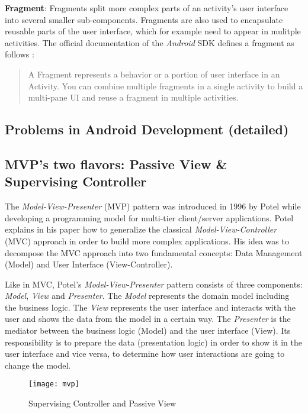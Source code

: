 \textbf{Fragment}: Fragments split more complex parts of an activity's user interface into several smaller sub-components. Fragments are also used to encapsulate reusable parts of the user interface, which for example need to appear in mulitple activities. The official documentation of the \emph{Android} SDK defines a fragment as follows \cite{SDKFragments}:

\begin{quote}
A Fragment represents a behavior or a portion of user interface in an Activity. You can combine multiple fragments in a single activity to build a multi-pane UI and reuse a fragment in multiple activities.
\end{quote}


\subsection{Problems in Android Development (detailed)}

\subsection{MVP's two flavors: Passive View \& Supervising Controller}

The \emph{Model-View-Presenter} (MVP) pattern was introduced in 1996 by Potel \cite{TaligentMVP} while developing a programming model for multi-tier client/server applications. Potel explains in his paper how to generalize the classical \emph{Model-View-Controller} (MVC) approach in order to build more complex applications. His idea was to decompose the MVC approach into two fundamental concepts: Data Management (Model) and User Interface (View-Controller).

Like in MVC, Potel's \emph{Model-View-Presenter} pattern consists of three components: \emph{Model}, \emph{View} and \emph{Presenter}. The \emph{Model} represents the domain model including the business logic. The \emph{View} represents the user interface and interacts with the user and shows the data from the model in a certain way. The \emph{Presenter} is the mediator between the business logic (Model) and the user interface (View). Its responsibility is to prepare the data (presentation logic) in order to show it in the user interface and vice versa, to determine how user interactions are going to change the model.

\begin{figure}[!t]
\centering
\texttt{[image: mvp]}
\caption{Supervising Controller and Passive View}
\label{fig:mvp}
\end{figure}

